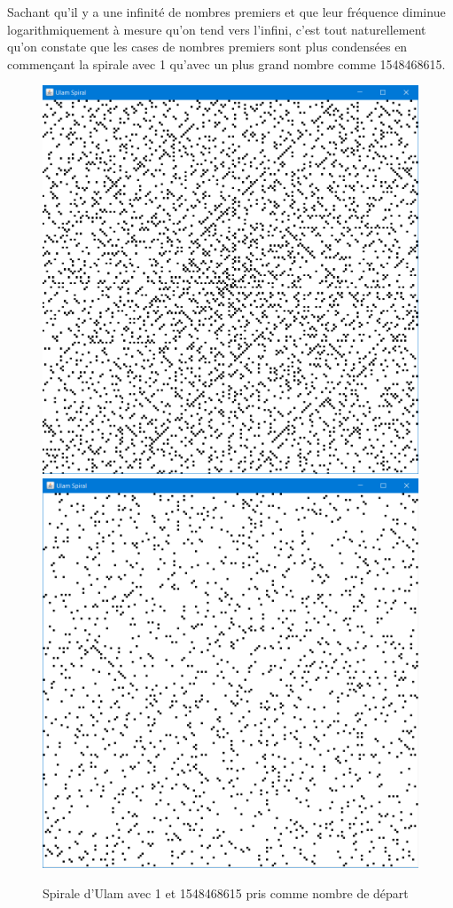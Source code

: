 Sachant qu'il y a une infinité de nombres premiers et que leur fréquence diminue logarithmiquement à mesure qu'on tend vers l'infini, c'est tout naturellement qu'on constate que les cases de nombres premiers sont plus condensées en commençant la spirale avec 1 qu'avec un plus grand nombre comme 1548468615.

\begin{figure}[H]
\begin{center}
\includegraphics[scale=0.3]{images/spirale_1.PNG}
\includegraphics[scale=0.3]{images/spirale_grandNB.PNG}
\end{center}
\caption{Spirale d'Ulam avec 1 et 1548468615 pris comme nombre de départ}
\end{figure}


